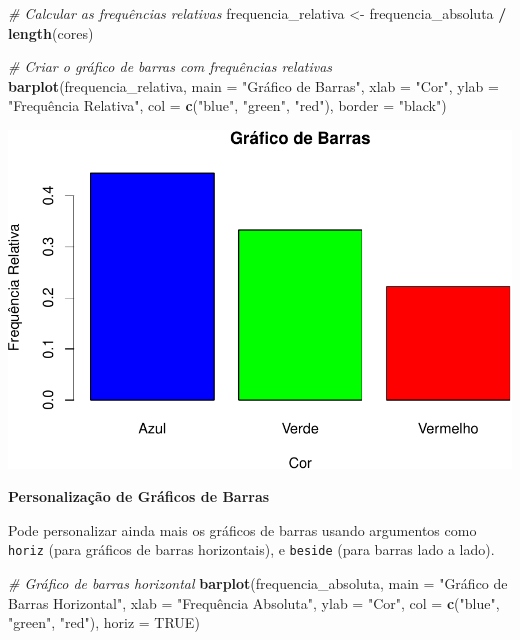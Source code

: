 \documentclass[
]{book}
\newenvironment{Shaded}{\begin{snugshade}}{\end{snugshade}}
\newcommand{\AttributeTok}[1]{\textcolor[rgb]{0.13,0.29,0.53}{#1}}
\newcommand{\CommentTok}[1]{\textcolor[rgb]{0.56,0.35,0.01}{\textit{#1}}}
\newcommand{\ConstantTok}[1]{\textcolor[rgb]{0.56,0.35,0.01}{#1}}
\newcommand{\FunctionTok}[1]{\textcolor[rgb]{0.13,0.29,0.53}{\textbf{#1}}}
\newcommand{\NormalTok}[1]{#1}
\newcommand{\OtherTok}[1]{\textcolor[rgb]{0.56,0.35,0.01}{#1}}
\newcommand{\SpecialCharTok}[1]{\textcolor[rgb]{0.81,0.36,0.00}{\textbf{#1}}}
\newcommand{\StringTok}[1]{\textcolor[rgb]{0.31,0.60,0.02}{#1}}
\begin{document}
\begin{Shaded}
\begin{Highlighting}[]
\CommentTok{\# Calcular as frequências relativas}
\NormalTok{frequencia\_relativa }\OtherTok{\textless{}{-}}\NormalTok{ frequencia\_absoluta }\SpecialCharTok{/} \FunctionTok{length}\NormalTok{(cores)  }
    
\CommentTok{\# Criar o gráfico de barras com frequências relativas}
\FunctionTok{barplot}\NormalTok{(frequencia\_relativa,         }
  \AttributeTok{main =} \StringTok{"Gráfico de Barras"}\NormalTok{,         }
  \AttributeTok{xlab =} \StringTok{"Cor"}\NormalTok{,         }
  \AttributeTok{ylab =} \StringTok{"Frequência Relativa"}\NormalTok{,}
  \AttributeTok{col =} \FunctionTok{c}\NormalTok{(}\StringTok{"blue"}\NormalTok{, }\StringTok{"green"}\NormalTok{, }\StringTok{"red"}\NormalTok{),}
  \AttributeTok{border =} \StringTok{"black"}\NormalTok{) }
\end{Highlighting}
\end{Shaded}

\includegraphics{introR_files/figure-latex/unnamed-chunk-162-1.pdf}

\textbf{Personalização de Gráficos de Barras}

Pode personalizar ainda mais os gráficos de barras usando argumentos
como \texttt{horiz} (para gráficos de barras horizontais), e \texttt{beside} (para
barras lado a lado).

\begin{Shaded}
\begin{Highlighting}[]
\CommentTok{\# Gráfico de barras horizontal}
\FunctionTok{barplot}\NormalTok{(frequencia\_absoluta, }
        \AttributeTok{main =} \StringTok{"Gráfico de Barras Horizontal"}\NormalTok{,}
        \AttributeTok{xlab =} \StringTok{"Frequência Absoluta"}\NormalTok{,}
        \AttributeTok{ylab =} \StringTok{"Cor"}\NormalTok{,}
        \AttributeTok{col =} \FunctionTok{c}\NormalTok{(}\StringTok{"blue"}\NormalTok{, }\StringTok{"green"}\NormalTok{, }\StringTok{"red"}\NormalTok{),}
        \AttributeTok{horiz =} \ConstantTok{TRUE}\NormalTok{)}
\end{Highlighting}
\end{Shaded}
\end{document}
